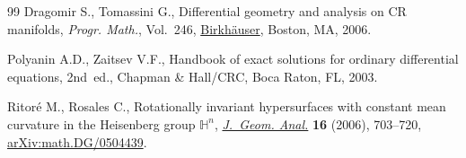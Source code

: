 \documentclass[10pt,a4paper]{amsart}
\numberwithin{equation}{section}
\begin{document}
\begin{thebibliography}{99}
Dragomir S., Tomassini G., Differential geometry and analysis on {CR}
 manifolds, \textit{Progr. Math.}, Vol.~246, \href{https://doi.org/10.1007/0-8176-4483-0}{Birkh\"auser}, Boston, MA, 2006.

Polyanin A.D., Zaitsev V.F., Handbook of exact solutions for ordinary
 differential equations, 2nd~ed., Chapman \& Hall/CRC, Boca Raton, FL, 2003.

Ritor\'e M., Rosales C., Rotationally invariant hypersurfaces with constant
 mean curvature in the {H}eisenberg group {$\mathbb H^n$}, \href{https://doi.org/10.1007/BF02922137}{\textit{J.~Geom.
 Anal.}} \textbf{16} (2006), 703--720, \href{https://arxiv.org/abs/math.DG/0504439}{arXiv:math.DG/0504439}.

\end{thebibliography}
\end{document}
